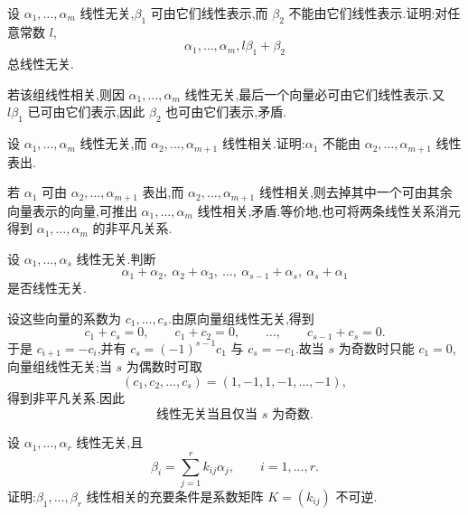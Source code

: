 \begin{example}
设 $\alpha_1,\ldots,\alpha_m$ 线性无关,$\beta_1$ 可由它们线性表示,而 $\beta_2$ 不能由它们线性表示.证明:对任意常数 $l$,
\[
 \alpha_1,\ldots,\alpha_m,l\beta_1+\beta_2
\]
总线性无关.
\end{example}
\exampleblank

\begin{solution}
若该组线性相关,则因 $\alpha_1,\ldots,\alpha_m$ 线性无关,最后一个向量必可由它们线性表示.又 $l\beta_1$ 已可由它们表示,因此 $\beta_2$ 也可由它们表示,矛盾.
\end{solution}

\begin{example}
设 $\alpha_1,\ldots,\alpha_m$ 线性无关,而 $\alpha_2,\ldots,\alpha_{m+1}$ 线性相关.证明:$\alpha_1$ 不能由 $\alpha_2,\ldots,\alpha_{m+1}$ 线性表出.
\end{example}
\exampleblank

\begin{solution}
若 $\alpha_1$ 可由 $\alpha_2,\ldots,\alpha_{m+1}$ 表出,而 $\alpha_2,\ldots,\alpha_{m+1}$ 线性相关,则去掉其中一个可由其余向量表示的向量,可推出 $\alpha_1,\ldots,\alpha_m$ 线性相关,矛盾.等价地,也可将两条线性关系消元得到 $\alpha_1,\ldots,\alpha_m$ 的非平凡关系.
\end{solution}

\begin{example}
设 $\alpha_1,\ldots,\alpha_s$ 线性无关.判断
\[
 \alpha_1+\alpha_2,\ \alpha_2+\alpha_3,\ \ldots,\ \alpha_{s-1}+\alpha_s,\ \alpha_s+\alpha_1
\]
是否线性无关.
\end{example}
\exampleblank

\begin{solution}
设这些向量的系数为 $c_1,\ldots,c_s$.由原向量组线性无关,得到
\[
 c_1+c_s=0,\qquad c_1+c_2=0,\qquad\ldots,\qquad c_{s-1}+c_s=0.
\]
于是 $c_{i+1}=-c_i$,并有 $c_s=(-1)^{s-1}c_1$ 与 $c_s=-c_1$.故当 $s$ 为奇数时只能 $c_1=0$,向量组线性无关;当 $s$ 为偶数时可取
\[
 (c_1,c_2,\ldots,c_s)=(1,-1,1,-1,\ldots,-1),
\]
得到非平凡关系.因此
\[
 \boxed{\text{线性无关当且仅当 }s\text{ 为奇数}.}
\]
\end{solution}

\begin{example}[\markstar]
设 $\alpha_1,\ldots,\alpha_r$ 线性无关,且
\[
 \beta_i=\sum\limits_{j=1}^r k_{ij}\alpha_j,\qquad i=1,\ldots,r.
\]
证明:$\beta_1,\ldots,\beta_r$ 线性相关的充要条件是系数矩阵 $K=(k_{ij})$ 不可逆.
\end{example}
\exampleblank


